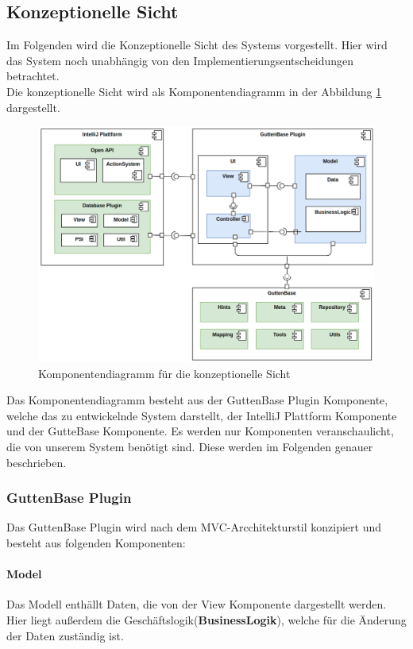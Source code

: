 	\subsection{Konzeptionelle Sicht}
	Im Folgenden wird die Konzeptionelle Sicht des Systems vorgestellt. Hier wird das System noch unabhängig von den Implementierungsentscheidungen betrachtet. \\
	Die konzeptionelle Sicht wird als Komponentendiagramm in der Abbildung \ref{img:component-diagram} dargestellt. 
	\begin{figure}[H]
		\centering
		\includegraphics[width=\textwidth]{images/sichten/component-diagram}
		\caption{Komponentendiagramm für die konzeptionelle Sicht}
		\label{img:component-diagram}
	\end{figure}
	Das Komponentendiagramm besteht aus der GuttenBase Plugin Komponente, welche das zu entwickelnde System darstellt, der IntelliJ Plattform Komponente und der GutteBase Komponente. Es werden nur Komponenten veranschaulicht, die von unserem System benötigt sind. Diese werden im Folgenden genauer beschrieben.
	
	
	\subsubsection{GuttenBase Plugin}
	Das GuttenBase Plugin wird nach dem MVC-Arcchitekturstil konzipiert und besteht aus folgenden Komponenten:
	
	\paragraph*{Model}
	Das Modell enthällt Daten, die von der View Komponente dargestellt werden. Hier liegt außerdem die Geschäftslogik(\textbf{BusinessLogik}), welche für die Änderung der Daten zuständig ist.
	
